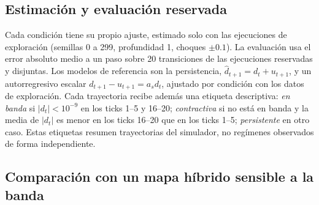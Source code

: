 \subsection{Estimación y evaluación reservada}

Cada condición tiene su propio ajuste, estimado solo con las ejecuciones de exploración (semillas 0 a 299, profundidad 1, choques $\pm0.1$). La evaluación usa el error absoluto medio a un paso sobre 20 transiciones de las ejecuciones reservadas y disjuntas. Los modelos de referencia son la persistencia, $\hat d_{t+1}=d_t+u_{t+1}$, y un autorregresivo escalar $d_{t+1}-u_{t+1}=a_s d_t$, ajustado por condición con los datos de exploración. Cada trayectoria recibe además una etiqueta descriptiva: \emph{en banda} si $|d_t|<10^{-9}$ en los ticks 1--5 y 16--20; \emph{contractiva} si no está en banda y la media de $|d_t|$ es menor en los ticks 16--20 que en los ticks 1--5; \emph{persistente} en otro caso. Estas etiquetas resumen trayectorias del simulador, no regímenes observados de forma independiente.

\subsection{Comparación con un mapa híbrido sensible a la banda}
\label{sec:hybrid-method}

